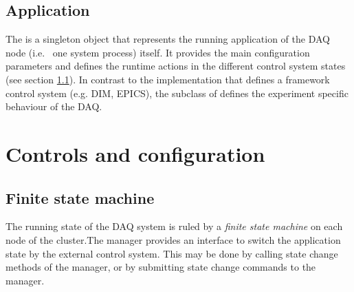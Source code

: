    

\subsection{Application}
The  is a singleton object that represents the running application of the DAQ node 
(i.e.~ one system process) itself. It provides the main configuration parameters
and defines the runtime actions in the different control system states (see section \ref{prog_fsm}).
In contrast to the  implementation that defines a framework control system (e.g. DIM, EPICS), the subclass of  defines the experiment specific behaviour of the DAQ.


               
\section{Controls and configuration}
\subsection{Finite state machine}
\label{prog_fsm}
The running state of the DAQ system is ruled by a {\sl finite state machine} on 
each node of the cluster.The manager provides an interface to switch the application 
	 state by the external control system. This may be done by calling 
	 state change methods of the manager, or by submitting state change commands 
      to the manager.

